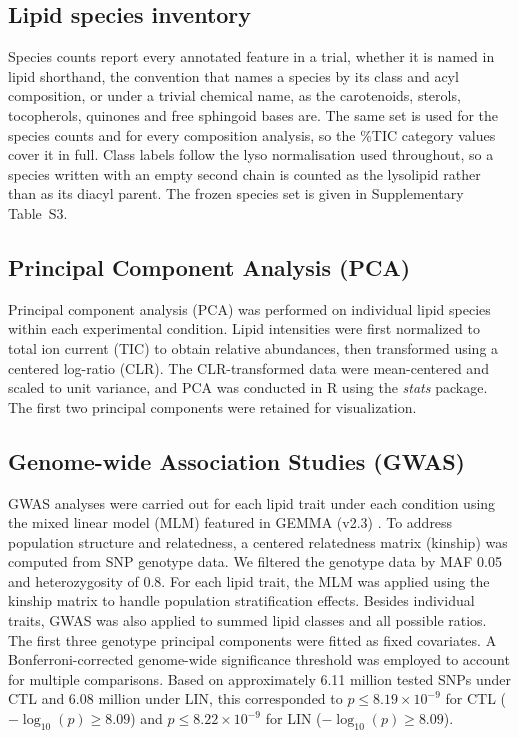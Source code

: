 \documentclass[9pt,twocolumn,twoside]{rilabRxiv}
\begin{document}
\subsection*{Lipid species inventory}

Species counts report every annotated feature in a trial, whether it is named in lipid shorthand, the convention that names a species by its class and acyl composition, or under a trivial chemical name, as the carotenoids, sterols, tocopherols, quinones and free sphingoid bases are. The same set is used for the species counts and for every composition analysis, so the \%TIC category values cover it in full. Class labels follow the lyso normalisation used throughout, so a species written with an empty second chain is counted as the lysolipid rather than as its diacyl parent. The frozen species set is given in Supplementary Table~S3.

\subsection*{Principal Component Analysis (PCA)}

Principal component analysis (PCA) was performed on individual lipid species within each experimental condition. Lipid intensities were first normalized to total ion current (TIC) to obtain relative abundances, then transformed using a centered log-ratio (CLR). The CLR-transformed data were mean-centered and scaled to unit variance, and PCA was conducted in R using the \emph{stats} package. The first two principal components were retained for visualization.

\subsection*{Genome-wide Association Studies (GWAS)}

GWAS analyses were carried out for each lipid trait under each condition using the mixed linear model (MLM) featured in GEMMA (v2.3) \citep{Zhou2012}. To address population structure and relatedness, a centered relatedness matrix (kinship) was computed from SNP genotype data. We filtered the genotype data by MAF 0.05 and heterozygosity of 0.8. For each lipid trait, the MLM was applied using the kinship matrix to handle population stratification effects. Besides individual traits, GWAS was also applied to summed lipid classes and all possible ratios. The first three genotype principal components were fitted as fixed covariates. A Bonferroni-corrected genome-wide significance threshold was employed to account for multiple comparisons. Based on approximately 6.11 million tested SNPs under CTL and 6.08 million under LIN, this corresponded to $p \le 8.19\times10^{-9}$ for CTL ($-\log_{10}(p)\ge 8.09$) and $p \le 8.22\times10^{-9}$ for LIN ($-\log_{10}(p)\ge 8.09$).
\end{document}
